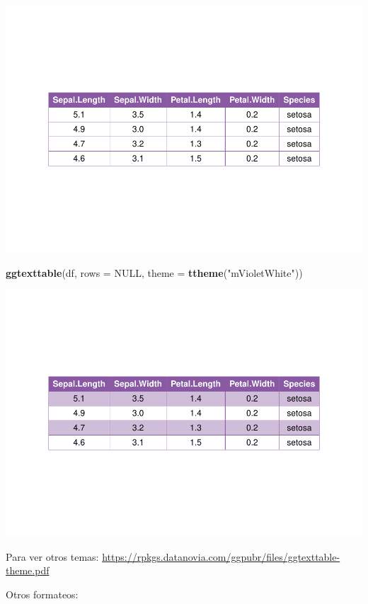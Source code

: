\documentclass[
]{book}
\newenvironment{Shaded}{\begin{snugshade}}{\end{snugshade}}
\newcommand{\AttributeTok}[1]{\textcolor[rgb]{0.13,0.29,0.53}{#1}}
\newcommand{\ConstantTok}[1]{\textcolor[rgb]{0.56,0.35,0.01}{#1}}
\newcommand{\FunctionTok}[1]{\textcolor[rgb]{0.13,0.29,0.53}{\textbf{#1}}}
\newcommand{\NormalTok}[1]{#1}
\newcommand{\StringTok}[1]{\textcolor[rgb]{0.31,0.60,0.02}{#1}}
\begin{document}
\includegraphics{R_Manual_files/figure-latex/unnamed-chunk-232-5.pdf}

\begin{Shaded}
\begin{Highlighting}[]
\FunctionTok{ggtexttable}\NormalTok{(df, }\AttributeTok{rows =} \ConstantTok{NULL}\NormalTok{, }\AttributeTok{theme =} \FunctionTok{ttheme}\NormalTok{(}\StringTok{"mVioletWhite"}\NormalTok{))}
\end{Highlighting}
\end{Shaded}

\includegraphics{R_Manual_files/figure-latex/unnamed-chunk-232-6.pdf}

Para ver otros temas: \url{https://rpkgs.datanovia.com/ggpubr/files/ggtexttable-theme.pdf}

Otros formateos:
\end{document}
